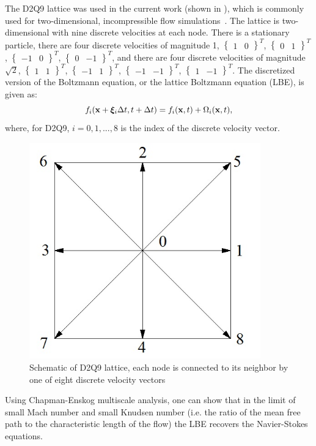 The D2Q9 lattice was used in the current work (shown in ), which is commonly used for two-dimensional, incompressible flow simulations~\cite{Suc01}.
The lattice is two-dimensional with nine discrete velocities at each node.
There is a stationary particle, there are four discrete velocities of magnitude 1, $\begin{Bmatrix}1 & 0\end{Bmatrix}^T$, $\begin{Bmatrix}0 & 1\end{Bmatrix}^T$, $\begin{Bmatrix}-1 & 0\end{Bmatrix}^T$, $\begin{Bmatrix}0 & -1\end{Bmatrix}^T$, and there are four discrete velocities of magnitude $\sqrt{2}$, $\begin{Bmatrix}1 & 1\end{Bmatrix}^T$, $\begin{Bmatrix}-1 & 1\end{Bmatrix}^T$, $\begin{Bmatrix}-1 & -1\end{Bmatrix}^T$, $\begin{Bmatrix}1 & -1\end{Bmatrix}^T$.
The discretized version of the Boltzmann equation, or the lattice Boltzmann equation (LBE), is given as:
\begin{equation}
f_i(\mathbf{x} + \boldsymbol{\xi}_i \Delta t, t + \Delta t) = f_i(\mathbf{x}, t) + \Omega_i(\mathbf{x}, t),
\end{equation}
\noindent where, for D2Q9, $i = 0, 1, ..., 8$ is the index of the discrete velocity vector.
\begin{figure}
  \centering
  \includegraphics[width=10cm]{figs/d2q9}
  \caption{Schematic of D2Q9 lattice, each node is connected to its neighbor by one of eight discrete velocity vectors}
  \label{fig:d2q9}
\end{figure}
Using Chapman-Enskog multiscale analysis, one can show that in the limit of small Mach number and small Knudsen number (i.e. the ratio of the mean free path to the characteristic length of the flow) the LBE recovers the Navier-Stokes equations.

